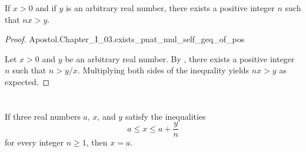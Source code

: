 \documentclass{report}
\begin{document}
\begin{theorem}[I.30]

  If $x > 0$ and if $y$ is an arbitrary real number, there exists a positive
    integer $n$ such that $nx > y$.

\end{theorem}

\begin{proof}

    {Apostol.Chapter\_I\_03.exists\_pnat\_mul\_self\_geq\_of\_pos}

  Let $x > 0$ and $y$ be an arbitrary real number.
  By , there exists a positive integer $n$ such that
    $n > y / x$.
  Multiplying both sides of the inequality yields $nx > y$ as expected.

\end{proof}

\section{}%
\label{sec:theorem-i.31}

\begin{theorem}[I.31]

  If three real numbers $a$, $x$, and $y$ satisfy the inequalities
    $$a \leq x \leq a + \frac{y}{n}$$ for every integer $n \geq 1$, then
    $x = a$.

\end{theorem}
\end{document}
